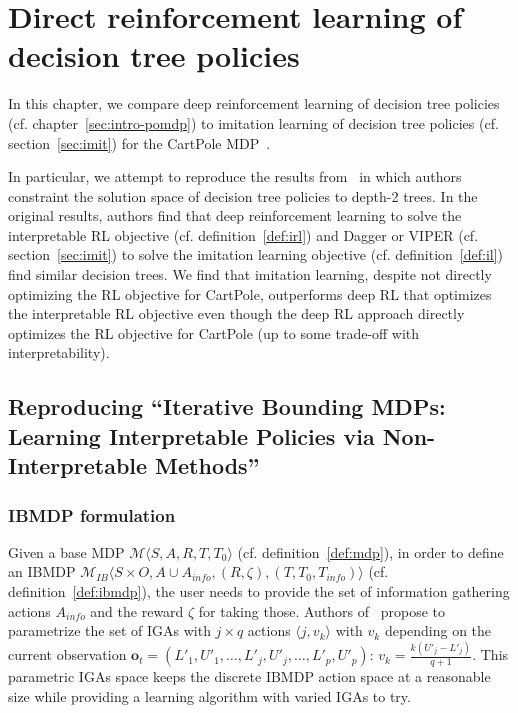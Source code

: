 \chapter{Direct reinforcement learning of decision tree policies}\label{sec:topin}
In this chapter, we compare deep reinforcement learning of decision tree policies (cf. chapter~\ref{sec:intro-pomdp}) to imitation learning of decision tree policies (cf. section~\ref{sec:imit}) for the CartPole MDP~\cite{cartpole}.

In particular, we attempt to reproduce the results from~\cite[table 1]{topin2021iterative} in which authors constraint the solution space of decision tree policies to depth-2 trees.
In the original results, authors find that deep reinforcement learning to solve the interpretable RL objective (cf. definition~\ref{def:irl}) and Dagger or VIPER (cf. section~\ref{sec:imit}) to solve the imitation learning objective (cf. definition~\ref{def:il}) find similar decision trees.
We find that imitation learning, despite not directly optimizing the RL objective for CartPole, outperforms deep RL that optimizes the interpretable RL objective even though the deep RL approach directly optimizes the RL objective for CartPole (up to some trade-off with interpretability).
\section{Reproducing ``Iterative Bounding MDPs: Learning Interpretable Policies via Non-Interpretable Methods''}

\subsection{IBMDP formulation}
Given a base MDP $\mathcal{M}\langle S, A, R, T, T_0\rangle$ (cf. definition~\ref{def:mdp}), in order to define an IBMDP $\mathcal{M}_{IB}\langle S\times O, A\cup A_{info}, (R, \zeta),( T, T_0, T_{info})\rangle$ (cf. definition~\ref{def:ibmdp}), the user needs to provide the set of information gathering actions $A_{info}$ and the reward $\zeta$ for taking those.
Authors of~\cite{topin2021iterative} propose to parametrize the set of IGAs with $j \times q$ actions $\langle j, v_k \rangle$ with $v_k$ depending on the current observation $\boldsymbol{o}_t=(L'_1, U'_1, \dots, L'_j, U'_j, \dots, L'_p, U'_p)$: $v_k = \frac{k(U'_j - L'_j)}{q+1}$.
This parametric IGAs space keeps the discrete IBMDP action space at a reasonable size while providing a learning algorithm with varied IGAs to try.

